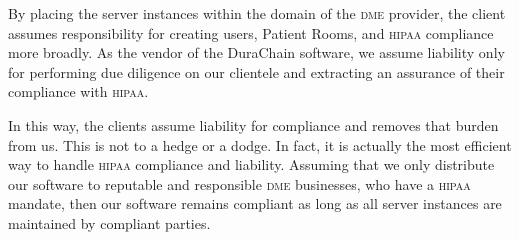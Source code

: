 By placing the server instances within the domain of the \textsc{dme} provider, the client assumes responsibility for creating users, Patient Rooms, and \textsc{hipaa} compliance more broadly. As the vendor of the DuraChain software, we assume liability only for performing due diligence on our clientele and extracting an assurance of their compliance with \textsc{hipaa}.%

In this way, the clients assume liability for compliance and removes that burden from us. This is not to a hedge or a dodge. In fact, it is actually the most efficient way to handle \textsc{hipaa} compliance and liability. Assuming that we only distribute our software to reputable and responsible \textsc{dme} businesses, who have a \textsc{hipaa} mandate, then our software remains compliant as long as all server instances are maintained by compliant parties.%

